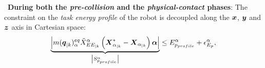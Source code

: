 \documentclass[letterpaper, 10 pt, conference]{ieeeconf}      %
\newcommand{\vect}[1]{\mbox{\boldmath${#1}$}}%
\begin{document}
\textbullet\ \textbf{During both the \textit{pre-collision} and the \textit{physical-contact} phases}: The constraint on the \textit{task energy profile} of the robot is decoupled along the $\vect{x}$, $\vect{y}$ and $\vect{z}$ axis in Cartesian space:
\begin{equation} 
\underbrace{\left|m(\vect{q}_{|k})_{\alpha}^{eq} \ddot{X}_{EE_{|k}}^{\alpha} \left(\vect{X}_{\alpha_{|k}}^{*} - \vect{X}_{\alpha_{|k}}\right) \vect{\alpha} \right|}_{\left|S_{p_{profile}}^{\alpha}\right|}\leq E_{p_{profile}}^{\alpha} + \epsilon_{E_p}^{\alpha},
\label{eq:Safe_constr_3_axis}
\end{equation}
\end{document}
